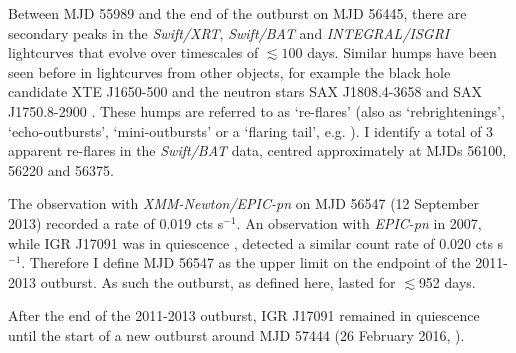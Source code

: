 \par Between MJD 55989 and the end of the outburst on MJD 56445, there are secondary peaks in the \indexxrt\textit{Swift/XRT}, \indexbat\textit{Swift/BAT} and \indexibis\textit{INTEGRAL/ISGRI} lightcurves that evolve over timescales of $\lesssim100$ days.  Similar humps have been seen before in lightcurves from other objects, for example the black hole candidate XTE J1650-500 \citep{Tomsick_MiniOutbursts} and the neutron stars SAX J1808.4-3658 \citep{Wijnands_1808} and SAX J1750.8-2900 \citep{Allen_1750}.  These humps are referred to as `re-flares' (also as `rebrightenings',  `echo-outbursts', `mini-outbursts' or a `flaring tail', e.g. \citealp{Patruno_Reflares2}).  I identify a total of 3 apparent re-flares in the \indexbat\textit{Swift/BAT} data, centred approximately at MJDs 56100, 56220 and 56375.
\par The observation with \indexepic\textit{XMM-Newton/EPIC-pn} on MJD 56547 (12 September 2013) recorded a rate of 0.019 cts s$^{-1}$.  An observation with \textit{EPIC-pn} in 2007, while IGR J17091 was in quiescence \citep{Wijnands_Quiescence}, detected a similar count rate of 0.020 cts s$^{-1}$.  Therefore I define MJD 56547 as the upper limit on the endpoint of the 2011-2013 outburst.  As such the outburst, as defined here, lasted for $\lesssim$952 days.
\par After the end of the 2011-2013 outburst, IGR J17091 remained in quiescence until the start of a new outburst around MJD 57444 (26 February 2016, \citealp{Miller_2016Outburst}).

\subsection{\rxte}

\label{sec:IGRclassesintro}


